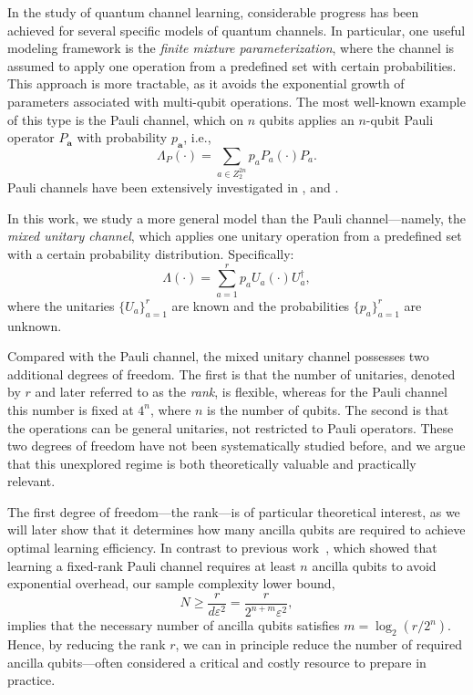 \documentclass[12pt]{article}
\begin{document}
In the study of quantum channel learning, considerable progress has been achieved for several specific models of quantum channels. In particular, one useful modeling framework is the \emph{finite mixture parameterization}, where the channel is assumed to apply one operation from a predefined set with certain probabilities. This approach is more tractable, as it avoids the exponential growth of parameters associated with multi-qubit operations. The most well-known example of this type is the Pauli channel, which on $n$ qubits applies an $n$-qubit Pauli operator $P_{\boldsymbol{a}}$ with probability $p_{\boldsymbol{a}}$, i.e.,
\begin{equation}
    \Lambda_P(\cdot) = \sum_{a\in Z_2^{2n}}p_a P_a(\cdot)P_a.
\end{equation}
Pauli channels have been extensively investigated in \cite{chen2022quantum}, \cite{flammia2020efficient} and \cite{chen2024tight}.

In this work, we study a more general model than the Pauli channel—namely, the \emph{mixed unitary channel}, which applies one unitary operation from a predefined set with a certain probability distribution. Specifically:
\begin{equation}\label{eq:muc}
    \Lambda(\cdot) = \sum_{a=1}^r p_a U_a (\cdot) U_a^\dagger,
\end{equation}
where the unitaries $\{U_a\}_{a=1}^r$ are known and the probabilities $\{p_a\}_{a=1}^r$ are unknown.

Compared with the Pauli channel, the mixed unitary channel possesses two additional degrees of freedom. The first is that the number of unitaries, denoted by $r$ and later referred to as the \emph{rank}, is flexible, whereas for the Pauli channel this number is fixed at $4^n$, where $n$ is the number of qubits. The second is that the operations can be general unitaries, not restricted to Pauli operators. These two degrees of freedom have not been systematically studied before, and we argue that this unexplored regime is both theoretically valuable and practically relevant.

The first degree of freedom---the rank---is of particular theoretical interest, as we will later show that it determines how many ancilla qubits are required to achieve optimal learning efficiency. In contrast to previous work~\cite{chen2022quantum}, which showed that learning a fixed-rank Pauli channel requires at least $n$ ancilla qubits to avoid exponential overhead, our sample complexity lower bound,
\begin{equation}
    N \ge \frac{r}{d\varepsilon^2} = \frac{r}{2^{n+m}\varepsilon^2},
\end{equation}
implies that the necessary number of ancilla qubits satisfies $m = \log_2(r / 2^n)$. Hence, by reducing the rank $r$, we can in principle reduce the number of required ancilla qubits---often considered a critical and costly resource to prepare in practice.
\end{document}
